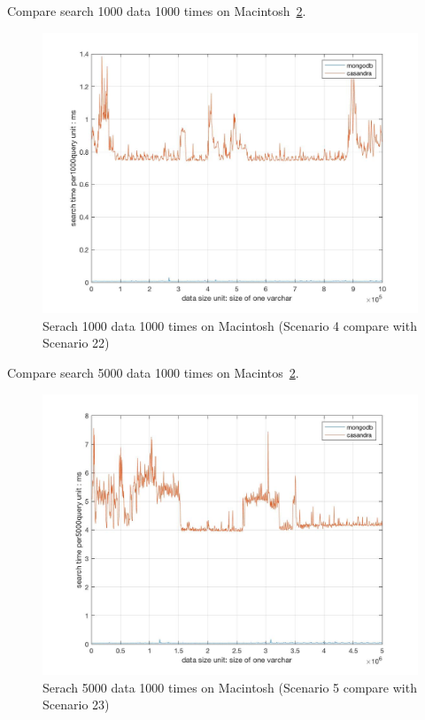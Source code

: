 Compare search 1000 data 1000 times on Macintosh~\ref{f:fly}.

\begin{figure}[!ht]
  \centering\includegraphics[width=\columnwidth]
  {images/search_comp_1000.jpg}
  \caption{Serach 1000 data 1000 times on Macintosh
   (Scenario 4 compare with Scenario 22) }\label{f:fly}
\end{figure}

Compare search 5000 data 1000 times on Macintos~\ref{f:fly}.

\begin{figure}[!ht]
  \centering\includegraphics[width=\columnwidth]
  {images/search_comp_5000.jpg}
  \caption{Serach 5000 data 1000 times on Macintosh
   (Scenario 5 compare with Scenario 23)}\label{f:fly}
\end{figure}

